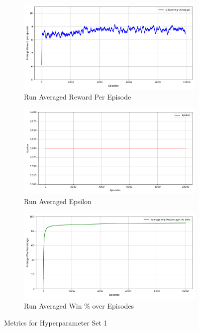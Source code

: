 \documentclass[a4paper,9pt]{scrartcl}
\begin{document}
\begin{figure}[H]
\centering
\begin{subfigure}[b]{0.32\textwidth}
\includegraphics[width=\textwidth]{images/q_learning_rewards_avg(1).png}
\caption{Run Averaged Reward Per Episode}
\label{fig:rewards_avg}
\end{subfigure}
\hfill
\begin{subfigure}[b]{0.32\textwidth}
\includegraphics[width=\textwidth]{images/q_learning_epsilon_avg(1).png}
\caption{Run Averaged Epsilon}
\label{fig:epsilon_avg}
\end{subfigure}
\hfill
\begin{subfigure}[b]{0.32\textwidth}
\includegraphics[width=\textwidth]{images/q_learning_win_percentage_avg(1).png}
\caption{Run Averaged Win \% over Episodes}
\label{fig:win_percent_avg}
\end{subfigure}
\caption{Metrics for Hyperparameter Set 1}
\label{fig:training_metrics}
\end{figure}
\end{document}
